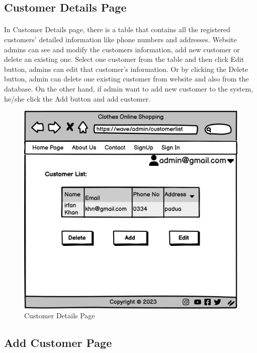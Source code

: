 \subsection{Customer Details Page}
\bigskip
\paragraph{}
In Customer Details page, there is a table that contains all the registered customers' detailed information like phone numbers and addresses. Website admins can see and modify the customers information, add new customer or delete an existing one. Select one customer from the table and then click Edit button, admins can edit that customer's information. Or by clicking the Delete button, admin can delete one existing customer from website and also from the database. On the other hand, if admin want to add new customer to the system, he/she click the Add button and add customer. 
\bigskip
\bigskip
\bigskip
\begin{figure}[h]
\centerline{\includegraphics[scale=1.]{images/Customer Details.png}}
\caption{Customer Details Page}
\label{fig}
\end{figure}

\newpage
\subsection{Add Customer Page}
\bigskip
